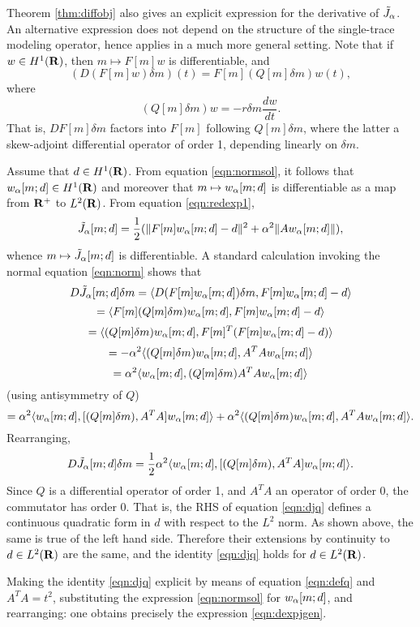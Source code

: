 Theorem \ref{thm:diffobj} also gives an explicit expression for the
derivative of $\tilde{J}_{\alpha}$. An alternative expression
does not depend on the structure of the single-trace modeling
operator, hence applies in a much more general setting. Note that if
$w \in H^1({\bf R})$, then $m \mapsto F[m]w$ is differentiable, and
\begin{equation}
\label{eqn:deriv}
(D(F[m]w)\delta m)(t) = F[m](Q[m]\delta m)w (t), 
\end{equation}
where 
\begin{equation}
\label{eqn:defq}
(Q[m]\delta m)w = -r\delta m \frac{dw}{dt}. 
\end{equation}
That is, $DF[m]\delta m$ factors into $F[m]$ following $Q[m]\delta m$,
where the latter a skew-adjoint differential operator of order 1,
depending linearly on $\delta m$.

Assume that $d \in H^1({\bf R})$. From equation \ref{eqn:normsol}, it
follows that $w_{\alpha}[m;d] \in H^1({\bf R})$ and moreover that $m \mapsto
w_{\alpha}[m;d]$ is differentiable as a map from ${\bf R}^+$ to
$L^2({\bf R})$. From equation \ref{eqn:redexp1},
\[
  \tilde{J}_{\alpha}[m;d] = \frac{1}{2}(\|F[m]w_{\alpha}[m;d]-d\|^2 + \alpha^2 \|Aw_{\alpha}[m;d]\|),
\]
whence $m \mapsto \tilde{J}_{\alpha}[m;d]$ is differentiable. A standard calculation
invoking the normal equation \ref{eqn:norm} shows that
\[
  D\tilde{J}_{\alpha}[m;d]\delta m = \langle D(F[m]w_{\alpha}[m;d])\delta m, F[m]w_{\alpha}[m;d]-d\rangle
\]
\[
  = \langle F[m](Q[m]\delta m)w_{\alpha}[m;d], F[m]w_{\alpha}[m;d]-d\rangle
\]
\[
  = \langle (Q[m]\delta m)w_{\alpha}[m;d], F[m]^T(F[m]w_{\alpha}[m;d]-d)\rangle
\]
\[
  = -\alpha^2\langle (Q[m]\delta m)w_{\alpha}[m;d],A^TAw_{\alpha}[m;d] \rangle
\]
\[
  = \alpha^2 \langle w_{\alpha}[m;d], (Q[m]\delta m)A^TA w_{\alpha}[m;d]\rangle
\]
(using antisymmetry of $Q$)
\[
  = \alpha^2 \langle w_{\alpha}[m;d],[ (Q[m]\delta m), A^TA]w_{\alpha}[m;d] \rangle
  + \alpha^2 \langle (Q[m]\delta m)w_{\alpha}[m;d],A^TAw_{\alpha}[m;d] \rangle.
\]
Rearranging,
\begin{equation}
  \label{eqn:djq}
  D\tilde{J}_{\alpha}[m;d]\delta m = \frac{1}{2}\alpha^2 \langle w_{\alpha}[m;d],[
  (Q[m]\delta m), A^TA]w_{\alpha}[m;d] \rangle.
\end{equation}
Since $Q$ is a differential operator of order 1, and $A^TA$ an
operator of order 0, the commutator has order 0. That is, the RHS of
equation \ref{eqn:djq} defines a continuous quadratic form in $d$ with
respect to the $L^2$ norm. As shown above, the same is true of the
left hand side. Therefore their extensions by continuity to $d \in
L^2({\bf R})$ are the same, and the identity \ref{eqn:djq} holds for $d
\in L^2({\bf R})$.

Making the identity \ref{eqn:djq} explicit by means of equation
\ref{eqn:defq} and $A^TA = t^2$, substituting the expression
\ref{eqn:normsol} for $w_{\alpha}[m;d]$, and rearranging: one obtains
precisely the expression \ref{eqn:dexpjgen}.

